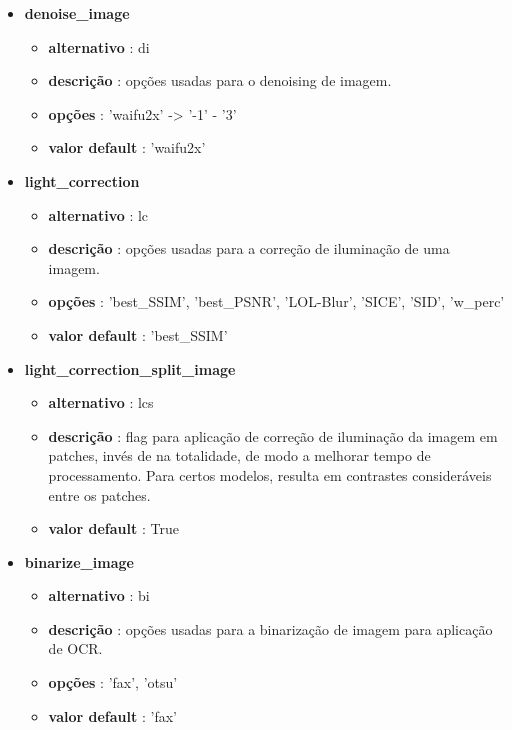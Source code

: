 \begin{itemize}
	\item \textbf{denoise\_image}
		\begin{itemize}\setlength\itemsep{-0.5em}
			\item \textbf{alternativo} : di
			\item \textbf{descrição} : opções usadas para o denoising de imagem.
			\item \textbf{opções} : 'waifu2x' -> '-1' - '3'
			\item \textbf{valor default} : 'waifu2x'
		\end{itemize}
	
	\item \textbf{light\_correction}
		\begin{itemize}\setlength\itemsep{-0.5em}
			\item \textbf{alternativo} : lc
			\item \textbf{descrição} : opções usadas para a correção de iluminação de uma imagem.
			\item \textbf{opções} : 'best\_SSIM', 'best\_PSNR', 'LOL-Blur', 'SICE', 'SID', 'w\_perc'
			\item \textbf{valor default} : 'best\_SSIM'
		\end{itemize}
		
	\item \textbf{light\_correction\_split\_image}
	\begin{itemize}\setlength\itemsep{-0.5em}
		\item \textbf{alternativo} : lcs
		\item \textbf{descrição} : flag para aplicação de correção de iluminação da imagem em patches, invés de na totalidade, de modo a melhorar tempo de processamento. Para certos modelos, resulta em contrastes consideráveis entre os patches.
		\item \textbf{valor default} : True
	\end{itemize}
	
	\item \textbf{binarize\_image}
		\begin{itemize}\setlength\itemsep{-0.5em}
			\item \textbf{alternativo} : bi
			\item \textbf{descrição} : opções usadas para a binarização de imagem para aplicação de OCR.
			\item \textbf{opções} : 'fax', 'otsu'
			\item \textbf{valor default} : 'fax'
		\end{itemize}
	

\end{itemize}
